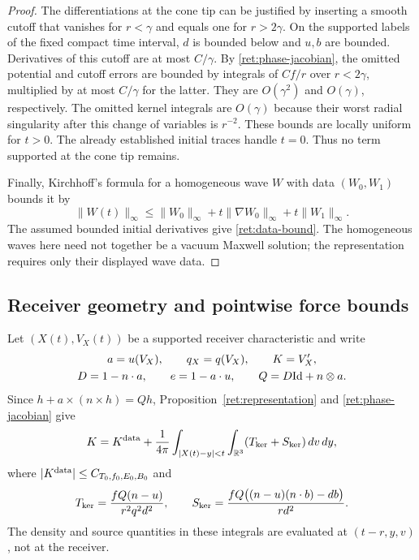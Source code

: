 \begin{proof}
The differentiations at the cone tip can be justified by inserting a
smooth cutoff that vanishes for $r<\gamma$ and equals one for
$r>2\gamma$. On the supported labels of the fixed compact time interval,
$d$ is bounded below and $u,b$ are bounded. Derivatives of this cutoff
are at most $C/\gamma$. By \eqref{ret:phase-jacobian}, the omitted
potential and cutoff errors are bounded by integrals of $Cf/r$ over
$r<2\gamma$, multiplied by at most $C/\gamma$ for the latter. They
are $O(\gamma^2)$ and $O(\gamma)$, respectively. The omitted kernel
integrals are $O(\gamma)$ because their worst radial singularity after
this change of variables is $r^{-2}$. These bounds are locally uniform
for $t>0$. The already established initial traces handle $t=0$.
Thus no term supported at the cone tip remains.

Finally, Kirchhoff's formula for a homogeneous wave $W$ with data
$(W_0,W_1)$ bounds it by
\[
 \|W(t)\|_\infty
 \leq\|W_0\|_\infty+t\|\nabla W_0\|_\infty+t\|W_1\|_\infty.
\]
The assumed bounded initial derivatives give \eqref{ret:data-bound}.
The homogeneous waves here need not together be a vacuum Maxwell
solution; the representation requires only their displayed wave data.
\end{proof}

\subsection{Receiver geometry and pointwise force bounds}

Let $(X(t),V_X(t))$ be a supported receiver characteristic and write
\[
 \begin{gathered}
 a=u(V_X),\qquad q_X=q(V_X),\qquad K=V_X',\\
 D=1-n\cdot a,\qquad e=1-a\cdot u,\qquad Q=D\mathrm{Id}+n\otimes a.
 \end{gathered}
\]
Since $h+a\times(n\times h)=Qh$, Proposition~\ref{ret:representation}
and \eqref{ret:phase-jacobian} give
\begin{equation}\label{ret:force}
 K=K^{\rm data}+\frac1{4\pi}\int_{|X(t)-y|<t}\int_{\mathbb R^3}
                (T_{\rm ker}+S_{\rm ker})\,dv\,dy,
\end{equation}
where $|K^{\rm data}|\leq C_{T_0,f_0,E_0,B_0}$ and
\begin{equation}\label{ret:force-kernels}
 T_{\rm ker}=\frac{fQ(n-u)}{r^2q^2d^2},\qquad
 S_{\rm ker}=\frac{fQ\bigl((n-u)(n\cdot b)-db\bigr)}{rd^2}.
\end{equation}
The density and source quantities in these integrals are evaluated at
$(t-r,y,v)$, not at the receiver.

